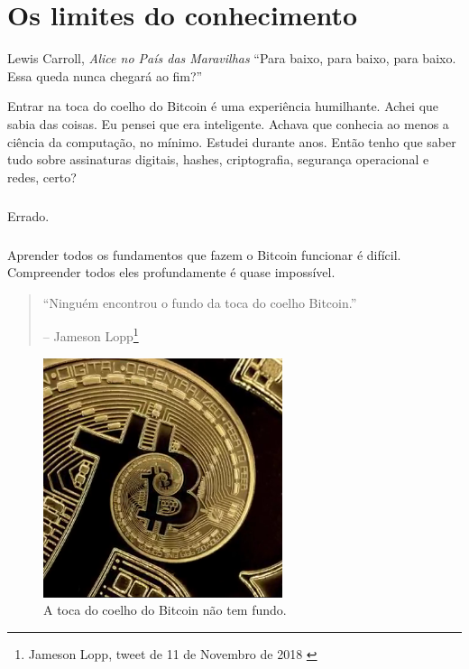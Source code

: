 \chapter{Os limites do conhecimento}
\label{les:7}

\begin{chapquote}{Lewis Carroll, \textit{Alice no País das Maravilhas}}
\enquote{Para baixo, para baixo, para baixo. Essa queda nunca chegará ao fim?}
\end{chapquote}

Entrar na toca do coelho do Bitcoin é uma experiência humilhante. Achei que sabia das coisas. Eu pensei que era inteligente. Achava que conhecia ao menos a ciência da computação, no mínimo. Estudei durante anos. Então tenho que saber tudo sobre assinaturas digitais, hashes, criptografia, segurança operacional e redes, certo?

\paragraph{}
Errado.

\paragraph{}
Aprender todos os fundamentos que fazem o Bitcoin funcionar é difícil. Compreender todos eles profundamente é quase impossível.

\begin{quotation}\begin{samepage}
\enquote{Ninguém encontrou o fundo da toca do coelho Bitcoin.}
\begin{flushright} -- Jameson Lopp\footnote{Jameson Lopp, tweet de 11 de Novembro de 2018 \cite{lopp-tweet}}
\end{flushright}\end{samepage}\end{quotation}

\begin{figure}
  \centering
  \includegraphics[width=7cm]{assets/images/rabbit-hole-bottomless.png}
  \caption{A toca do coelho do Bitcoin não tem fundo.}
  \label{fig:rabbit-hole-bottomless}
\end{figure}

